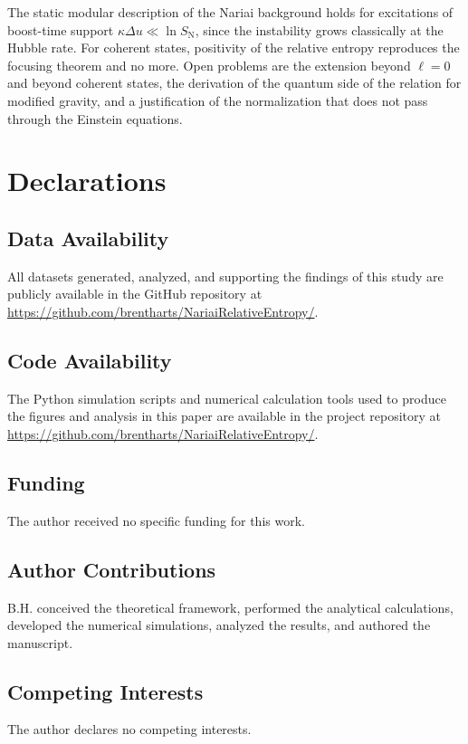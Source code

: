 \documentclass[11pt]{article}
\begin{document}
The static modular description of the Nariai background holds for excitations of boost-time support $\kappa\Delta u\ll\ln S_{\mathrm N}$, since the instability grows classically at the Hubble rate. For coherent states, positivity of the relative entropy reproduces the focusing theorem and no more. Open problems are the extension beyond $\ell=0$ and beyond coherent states, the derivation of the quantum side of the relation for modified gravity, and a justification of the normalization that does not pass through the Einstein equations.

\section*{Declarations}

\subsection*{Data Availability}
All datasets generated, analyzed, and supporting the findings of this study are publicly available in the GitHub repository at \url{https://github.com/brentharts/NariaiRelativeEntropy/}.

\subsection*{Code Availability}
The Python simulation scripts and numerical calculation tools used to produce the figures and analysis in this paper are available in the project repository at \url{https://github.com/brentharts/NariaiRelativeEntropy/}.

\subsection*{Funding}
The author received no specific funding for this work.

\subsection*{Author Contributions}
B.H. conceived the theoretical framework, performed the analytical calculations, developed the numerical simulations, analyzed the results, and authored the manuscript.

\subsection*{Competing Interests}
The author declares no competing interests.
\end{document}
